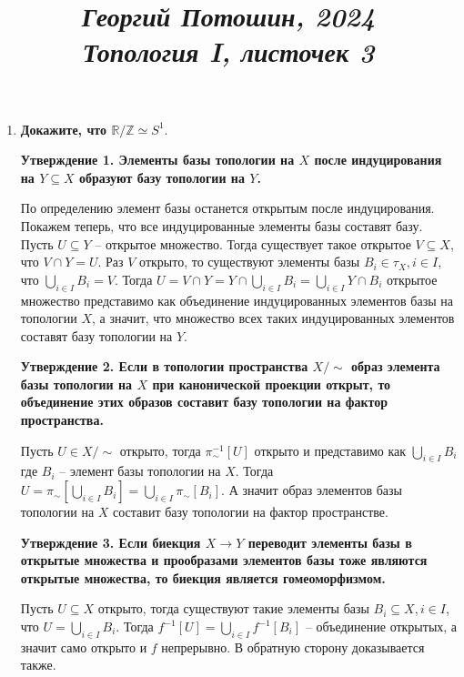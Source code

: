 \documentclass{article}
\title{
\textit{\small{Георгий Потошин, 2024}}\\
\vspace{0.3ex}
\textit{\huge{Топология I, листочек 3}}\vspace{1ex}
}
\date{\vspace{-10ex}}
\begin{document}
\maketitle

\begin{enumerate}
    \item \textbf{Докажите, что $\mathbb{R}/\mathbb{Z}\simeq S^1.$}\par
        \textbf{Утверждение 1. Элементы базы топологии на $X$ после
        индуцирования на $Y\subseteq X$ образуют базу топологии на $Y$.}\par
        По определению элемент базы останется открытым после индуцирования.
        Покажем теперь, что все индуцированные элементы базы составят
        базу. Пусть $U\subseteq Y$ – открытое множество. Тогда существует такое
        открытое $V\subseteq X$, что $V\cap Y=U$. Раз $V$ открыто, то
        существуют элементы базы $B_i\in \tau_X,i\in I$, что $\bigcup_{i\in I}
        B_i = V$. Тогда $U=V\cap Y=Y\cap\bigcup_{i\in I}B_i=\bigcup_{i\in I}Y\cap
        B_i$ открытое множество представимо как объединение индуцированных
        элементов базы на топологии $X$, а значит, что множество всех таких
        индуцированных элементов составят базу топологии на $Y$.\par

        \textbf{Утверждение 2. Если в топологии пространства $X/\sim$ образ
        элемента базы топологии на $X$ при канонической проекции открыт, то
        объединение этих образов составит базу топологии на фактор пространства.}
        \par Пусть $U\in X/\sim$ открыто, тогда $\pi_{\sim}^{-1}[U]$ открыто и
        представимо как $\bigcup_{i\in I}B_i$ где $B_i$ – элемент базы топологии
        на $X$. Тогда $U=\pi_{\sim}[\bigcup_{i\in I}B_i]=\bigcup_{i\in I}\pi_\sim
        [B_i]$. А значит образ элементов базы топологии на $X$ составит базу
        топологии на фактор пространстве.\par

        \textbf{Утверждение 3. Если биекция $X\longrightarrow Y$ переводит
        элементы базы в открытые множества и прообразами элементов базы тоже
        являются открытые множества, то биекция является гомеоморфизмом.}\par
        
        Пусть $U\subseteq X$ открыто, тогда существуют такие элементы базы
        $B_i\subseteq X,i\in I$, что $U=\bigcup_{i\in I}B_i$. Тогда $f^{-1}[U]=
        \bigcup_{i\in I}f^{-1}[B_i]$ – объединение открытых, а значит само
        открыто и $f$ непрерывно. В обратную сторону доказывается также.


\end{enumerate}
\end{document}
